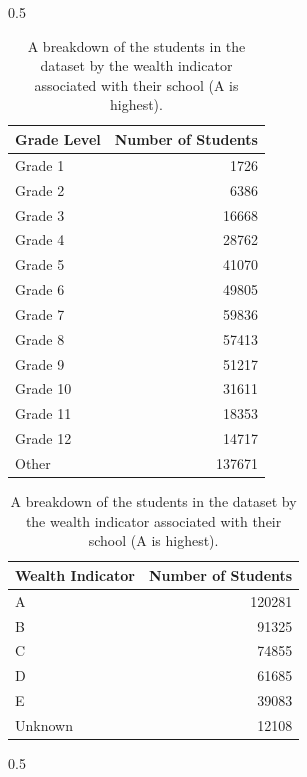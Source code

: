 \documentclass{article}
\begin{document}
\label{section:app:data}
\newcommand\pageSplitL{0.5}
\newcommand\pageSplitR{0.5}   
\newcommand\captionwidthr{0.7}   
\begin{table}[h]
\centering
 \begin{subtable}[b]{\pageSplitL\linewidth}\centering
   \captionsetup{width=\captionwidthr\linewidth}
    {\begin{tabular}{l r}
      \toprule
      \multicolumn{1}{r}{\bf Grade Level} & \multicolumn{1}{c}{ \bf Number of Students} \\
      \midrule
      Grade 1 & 1726 \\
      Grade 2 & 6386 \\
      Grade 3 & 16668 \\
      Grade 4 & 28762 \\
      Grade 5 & 41070 \\
      Grade 6 & 49805 \\
      Grade 7 & 59836 \\
      Grade 8 & 57413 \\
      Grade 9 & 51217 \\
      Grade 10 & 31611 \\
      Grade 11 & 18353 \\
      Grade 12 & 14717 \\
      Other & 137671 \\
      \bottomrule
\end{tabular}
\caption{A breakdown of the students in the dataset by grade level.}
\vspace{4.47em}
  \begin{tabular}{l r}
      \toprule
      \multicolumn{1}{r}{\bf Wealth Indicator} & \multicolumn{1}{c}{ \bf Number of Students} \\
      \midrule
      A & 120281 \\
      B & 91325 \\
      C & 74855 \\
      D & 61685 \\
      E & 39083 \\
      Unknown & 12108 \\
      \bottomrule
\end{tabular}
\caption{A breakdown of the students in the dataset by the wealth indicator associated with their school (A is highest).}}
\end{subtable}%
\begin{subtable}[b]{\pageSplitR\linewidth}\centering{
\captionsetup{width=\captionwidthr\linewidth}
  \centering
  \begin{tabular}{l r}

\end{tabular}}
\end{subtable}
\end{table}
\end{document}
